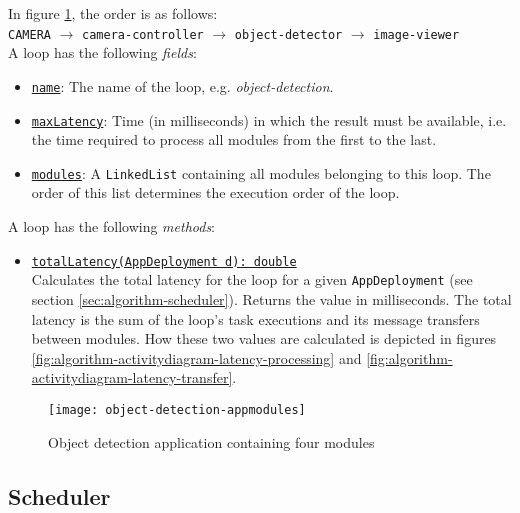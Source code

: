 \begin{itemize}
   In figure \ref{fig:object-detection-appmodules}, the order is as follows:\\
    \texttt{CAMERA} $\rightarrow$ \texttt{camera-controller} $\rightarrow$ \texttt{object-detector} $\rightarrow$ \texttt{image-viewer}\\[0.5ex]
   A loop has the following \textit{fields}:
   \begin{itemize}
       \item \underline{\texttt{name}}: The name of the loop, e.g. \textit{object-detection}.
       \item \underline{\texttt{maxLatency}}: Time (in milliseconds) in which the result must be available, i.e. the time required to process all modules from the first to the last.
       \item \underline{\texttt{modules}}: A \texttt{LinkedList} containing all modules belonging to this loop. The order of this list determines the execution order of the loop.
   \end{itemize}
   A loop has the following \textit{methods}:
   \begin{itemize}
       \item \underline{\texttt{totalLatency(AppDeployment d): double}}\\
       Calculates the total latency for the loop for a given \texttt{AppDeployment} (see section \ref{sec:algorithm-scheduler}).
       Returns the value in milliseconds. The total latency is the sum of the loop's task executions and its message transfers between modules.
       How these two values are calculated is depicted in figures \ref{fig:algorithm-activitydiagram-latency-processing} and \ref{fig:algorithm-activitydiagram-latency-transfer}.
   \end{itemize}
\end{itemize}

\begin{figure}[htbp]
    \centering
    \texttt{[image: object-detection-appmodules]}
    \caption{Object detection application containing four modules}
    \label{fig:object-detection-appmodules}
\end{figure}



\subsection{Scheduler\label{sec:algorithm-scheduler}}

